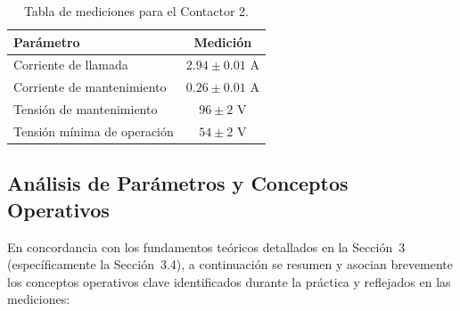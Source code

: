 \begin{table}[H]
    \centering
    \caption{Tabla de mediciones para el Contactor 2.}
    \label{tab:contactor_2}
    \begin{tabular}{lc}
        \toprule
        \textbf{Parámetro} & \textbf{Medición} \\
        \midrule
        Corriente de llamada & $\num{2,94} \pm \num{0,01}$ \si{\ampere} \\
        Corriente de mantenimiento & $\num{0,26} \pm \num{0,01}$ \si{\ampere} \\
        Tensión de mantenimiento & $\num{96} \pm \num{2}$ \si{\volt} \\
        Tensión mínima de operación & $\num{54} \pm \num{2}$ \si{\volt} \\
        \bottomrule
    \end{tabular}
\end{table}

\subsection{Análisis de Parámetros y Conceptos Operativos}
En concordancia con los fundamentos teóricos detallados en la Sección~3 (específicamente la Sección~3.4), a continuación se resumen y asocian brevemente los conceptos operativos clave identificados durante la práctica y reflejados en las mediciones:

